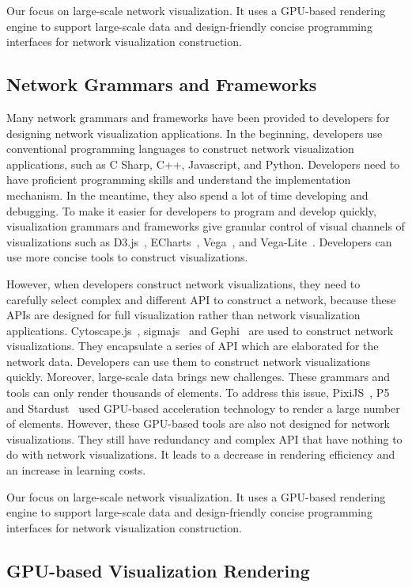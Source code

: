 Our \name focus on large-scale network visualization. It uses a GPU-based rendering engine to support large-scale data and design-friendly concise programming interfaces for network visualization construction.

\subsection{Network Grammars and Frameworks}
Many network grammars and frameworks have been provided to developers for designing network visualization applications.
In the beginning, developers use conventional programming languages to construct network visualization applications, such as C Sharp, C++, Javascript, and Python. Developers need to have proficient programming skills and understand the implementation mechanism.
In the meantime, they also spend a lot of time developing and debugging. To make it easier for developers to program and develop quickly, visualization grammars and frameworks give granular control of visual channels of visualizations such as D3.js~\cite{DBLP:journals/tvcg/BostockOH11}, ECharts~\cite{DBLP:journals/vi/LiMSSZWZC18}, Vega~\cite{DBLP:journals/tvcg/SatyanarayanRHH16}, and Vega-Lite~\cite{DBLP:journals/tvcg/SatyanarayanMWH17}. Developers can use more concise tools to construct visualizations.


However, when developers construct network visualizations, they need to carefully select complex and different API to construct a network, because these APIs are designed for full visualization rather than network visualization applications. Cytoscape.js~\cite{DBLP:journals/bioinformatics/FranzLHDSB16}, sigmajs~\cite{DBLP:journals/jossw/Coene18} and Gephi~\cite{DBLP:conf/icwsm/BastianHJ09} are used to construct network visualizations. They encapsulate a series of API which are elaborated for the network data. Developers can use them to construct network visualizations quickly.
Moreover, large-scale data brings new challenges. These grammars and tools can only render thousands of elements. To address this issue, PixiJS~\cite{graphicslearn}, P5~\cite{DBLP:journals/tvcg/LiM20} and Stardust~\cite{DBLP:journals/cgf/RenLH17} used GPU-based acceleration technology to render a large number of elements.
However, these GPU-based tools are also not designed for network visualizations.
They still have redundancy and complex API that have nothing to do with network visualizations. It leads to a decrease in rendering efficiency and an increase in learning costs.

Our \name focus on large-scale network visualization. It uses a GPU-based rendering engine to support large-scale data and design-friendly concise programming interfaces for network visualization construction.

\subsection{GPU-based Visualization Rendering}




